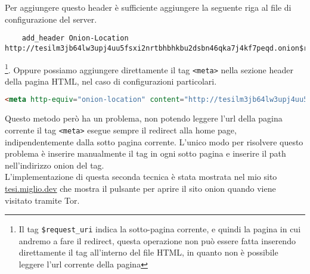 \newpage
Per aggiungere questo header è sufficiente aggiungere la seguente riga al file di configurazione del server.
\begin{lstlisting}
    add_header Onion-Location http://tesilm3jb64lw3upj4uu5fsxi2nrtbhbhkbu2dsbn46qka7j4kf7peqd.onion$request_uri;
\end{lstlisting}
\footnote{Il tag \lstinline{$request_uri} indica la sotto-pagina corrente, e quindi la pagina in cui andremo a fare il redirect, questa operazione non può essere fatta inserendo direttamente il tag all'interno del file HTML, in quanto non è possibile leggere l'url corrente della pagina}.
Oppure possiamo aggiungere direttamente il tag \lstinline{<meta>} nella sezione header della pagina HTML, nel caso di configurazioni particolari.
\begin{lstlisting}[language=HTML]
    <meta http-equiv="onion-location" content="http://tesilm3jb64lw3upj4uu5fsxi2nrtbhbhkbu2dsbn46qka7j4kf7peqd.onion" />
\end{lstlisting}
Questo metodo però ha un problema, non potendo leggere l'url della pagina corrente il tag \lstinline{<meta>} esegue sempre il redirect alla home page, indipendentemente dalla sotto pagina corrente. 
L'unico modo per risolvere questo problema è inserire manualmente il tag in ogni sotto pagina e inserire il path nell'indirizzo onion del tag. \\
L'implementazione di questa seconda tecnica è stata mostrata nel mio sito \href{https://tesi.miglio.dev}{tesi.miglio.dev} che mostra il pulsante per aprire il sito onion quando viene visitato tramite Tor. \\
\cite{OnionLocationHeader}
